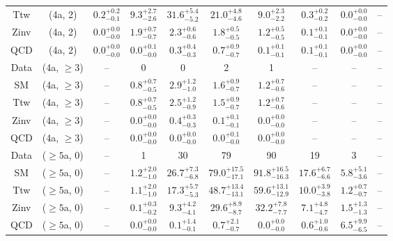\begin{table}[h!]
{\begin{tabular}{cccccccccc}
	Ttw & (4a, 2) & $0.2^{+ 0.2 }_{- 0.1 }$ & $9.3^{+ 2.7 }_{- 2.6 }$ & $31.6^{+ 5.4 }_{- 5.2 }$ & $21.0^{+ 4.8 }_{- 4.6 }$ & $9.0^{+ 2.3 }_{- 2.2 }$ & $0.3^{+ 0.2 }_{- 0.2 }$ & $0.0^{+ 0.0 }_{- 0.0 }$ & -- \\[0.5ex] 
	Zinv & (4a, 2) & $0.0^{+ 0.0 }_{- 0.0 }$ & $1.9^{+ 0.7 }_{- 0.7 }$ & $2.3^{+ 0.6 }_{- 0.6 }$ & $1.8^{+ 0.5 }_{- 0.5 }$ & $1.2^{+ 0.5 }_{- 0.5 }$ & $0.1^{+ 0.1 }_{- 0.1 }$ & $0.0^{+ 0.0 }_{- 0.0 }$ & -- \\[0.5ex] 
	QCD & (4a, 2) & $0.0^{+ 0.0 }_{- 0.0 }$ & $0.0^{+ 0.1 }_{- 0.0 }$ & $0.3^{+ 0.4 }_{- 0.3 }$ & $0.7^{+ 0.9 }_{- 0.7 }$ & $0.1^{+ 0.1 }_{- 0.1 }$ & $0.1^{+ 0.1 }_{- 0.1 }$ & $0.0^{+ 0.0 }_{- 0.0 }$ & -- \\[0.5ex] 
	Data & (4a, $\ge3$) & -- & 0 & 0 & 2 & 1 & -- & -- & -- \\[0.5ex] 
	SM & (4a, $\ge3$) & -- & $0.8^{+ 0.7 }_{- 0.5 }$ & $2.9^{+ 1.2 }_{- 1.0 }$ & $1.6^{+ 0.9 }_{- 0.7 }$ & $1.2^{+ 0.7 }_{- 0.6 }$ & -- & -- & -- \\[0.5ex] 
	Ttw & (4a, $\ge3$) & -- & $0.8^{+ 0.7 }_{- 0.5 }$ & $2.5^{+ 1.2 }_{- 0.9 }$ & $1.5^{+ 0.9 }_{- 0.7 }$ & $1.2^{+ 0.7 }_{- 0.6 }$ & -- & -- & -- \\[0.5ex] 
	Zinv & (4a, $\ge3$) & -- & $0.0^{+ 0.0 }_{- 0.0 }$ & $0.4^{+ 0.3 }_{- 0.3 }$ & $0.1^{+ 0.1 }_{- 0.1 }$ & $0.0^{+ 0.0 }_{- 0.0 }$ & -- & -- & -- \\[0.5ex] 
	QCD & (4a, $\ge3$) & -- & $0.0^{+ 0.0 }_{- 0.0 }$ & $0.0^{+ 0.0 }_{- 0.0 }$ & $0.0^{+ 0.1 }_{- 0.0 }$ & $0.0^{+ 0.0 }_{- 0.0 }$ & -- & -- & -- \\[0.5ex] 
	Data & ($\ge5$a, 0) & -- & 1 & 30 & 79 & 90 & 19 & 3 & -- \\[0.5ex] 
	SM & ($\ge5$a, 0) & -- & $1.2^{+ 2.0 }_{- 1.0 }$ & $26.7^{+ 7.3 }_{- 6.8 }$ & $79.0^{+ 17.5 }_{- 17.1 }$ & $91.8^{+ 16.5 }_{- 16.3 }$ & $17.6^{+ 6.7 }_{- 6.6 }$ & $5.8^{+ 5.1 }_{- 3.6 }$ & -- \\[0.5ex] 
	Ttw & ($\ge5$a, 0) & -- & $1.1^{+ 2.0 }_{- 1.0 }$ & $17.3^{+ 5.7 }_{- 5.3 }$ & $48.7^{+ 13.4 }_{- 13.1 }$ & $59.6^{+ 13.1 }_{- 12.9 }$ & $10.0^{+ 3.9 }_{- 3.8 }$ & $1.2^{+ 0.7 }_{- 0.7 }$ & -- \\[0.5ex] 
	Zinv & ($\ge5$a, 0) & -- & $0.1^{+ 0.3 }_{- 0.2 }$ & $9.3^{+ 4.2 }_{- 4.1 }$ & $29.6^{+ 8.9 }_{- 8.7 }$ & $32.2^{+ 7.8 }_{- 7.7 }$ & $7.1^{+ 4.8 }_{- 4.7 }$ & $1.5^{+ 1.3 }_{- 1.3 }$ & -- \\[0.5ex] 
	QCD & ($\ge5$a, 0) & -- & $0.0^{+ 0.0 }_{- 0.0 }$ & $0.1^{+ 1.4 }_{- 0.1 }$ & $0.7^{+ 2.1 }_{- 0.7 }$ & $0.0^{+ 0.0 }_{- 0.0 }$ & $0.6^{+ 1.0 }_{- 0.6 }$ & $6.5^{+ 9.9 }_{- 6.5 }$ & -- \\[0.5ex] 

\end{tabular}}
\end{table}
